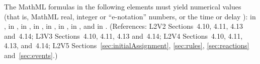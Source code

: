 The MathML formulas in the following elements must yield numerical
values (that is, MathML real, integer or ``e-notation'' numbers,
or the time or delay ):  in \KineticLaw,
 in \SpeciesReference,  in
\InitialAssignment,  in \AssignmentRule,  in
\RateRule,  in \AlgebraicRule,  in \Event
\Delay, and  in \EventAssignment.  (References: L2V2
Sections~4.10, 4.11, 4.13 and~4.14; L3V3 Sections~4.10, 4.11, 4.13 
and~4.14; L2V4 Sections~4.10, 4.11, 4.13, and~4.14; L2V5 Sections~\ref{sec:initialAssignment}, \ref{sec:rules}, \ref{sec:reactions} and~\ref{sec:events}.)


